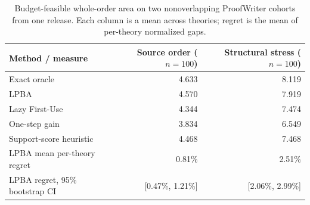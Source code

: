 \begin{table}[H]
\caption{Budget-feasible whole-order area on two nonoverlapping ProofWriter cohorts from one release. Each column is a mean across theories; regret is the mean of per-theory normalized gaps.\label{tab:proofwriter}}
\centering\small\renewcommand{\arraystretch}{1.08}
\begin{tabular}{lrr}
\toprule
Method / measure & Source order ($n=100$) & Structural stress ($n=100$) \\
\midrule
Exact oracle & 4.633 & 8.119 \\
LPBA & 4.570 & 7.919 \\
Lazy First-Use & 4.344 & 7.474 \\
One-step gain & 3.834 & 6.549 \\
Support-score heuristic & 4.468 & 7.468 \\
LPBA mean per-theory regret & 0.81\% & 2.51\% \\
LPBA regret, 95\% bootstrap CI & [0.47\%, 1.21\%] & [2.06\%, 2.99\%] \\
\bottomrule
\end{tabular}
\end{table}
